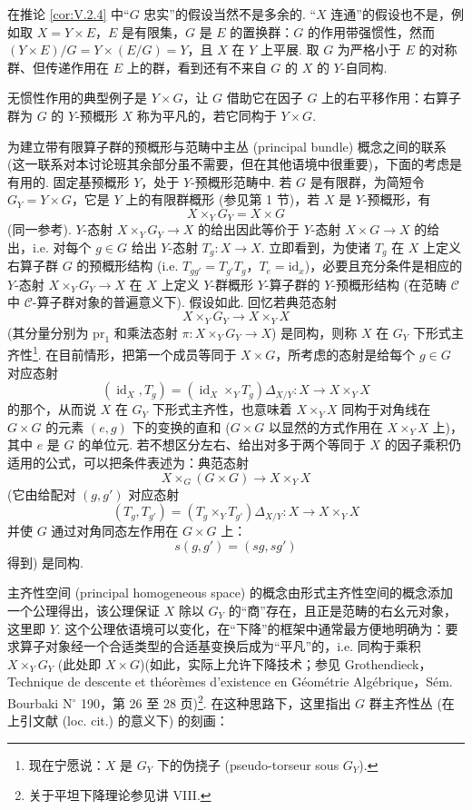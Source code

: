 \begin{remark}\label{rem:V.2.5}
在推论 \ref{cor:V.2.4} 中``$G$ 忠实''的假设当然不是多余的. ``$X$ 连通''的假设也不是，例如取 $X = Y \times E$，$E$ 是有限集，$G$ 是 $E$ 的置换群：$G$ 的作用带强惯性，然而 $(Y \times E)/G = Y \times (E/G) = Y$，且 $X$ 在 $Y$ 上平展. 取 $G$ 为严格小于 $E$ 的对称群、但传递作用在 $E$ 上的群，看到还有不来自 $G$ 的 $X$ 的 $Y$-自同构.
\end{remark}

无惯性作用的典型例子是 $Y \times G$，让 $G$ 借助它在因子 $G$ 上的右平移作用：右算子群为 $G$ 的 $Y$-预概形 $X$ 称为平凡的，若它同构于 $Y \times G$.

为建立带有限算子群的预概形与范畴中主丛 (principal bundle) 概念之间的联系 (这一联系对本讨论班其余部分虽不需要，但在其他语境中很重要)，下面的考虑是有用的. 固定基预概形 $Y$，处于 $Y$-预概形范畴中. 若 $G$ 是有限群，为简短令 $G_Y = Y \times G$，它是 $Y$ 上的有限群概形 (参见第 1 节)，若 $X$ 是 $Y$-预概形，有
\[
X \times_Y G_Y = X \times G
\]
(同一参考). $Y$-态射 $X \times_Y G_Y \to X$ 的给出因此等价于 $Y$-态射 $X \times G \to X$ 的给出，i.e. 对每个 $g \in G$ 给出 $Y$-态射 $T_g \colon X \to X$. 立即看到，为使诸 $T_g$ 在 $X$ 上定义右算子群 $G$ 的预概形结构 (i.e. $T_{gg'} = T_{g'}T_g$，$T_e = \mathrm{id}_x$)，必要且充分条件是相应的 $Y$-态射 $X \times_Y G_Y \to X$ 在 $X$ 上定义 $Y$-群概形 $Y$-算子群的 $Y$-预概形结构 (在范畴 $\mathcal{C}$ 中 $\mathcal{C}$-算子群对象的普遍意义下). 假设如此. 回忆若典范态射
\[
X \times_Y G_Y \longrightarrow X \times_Y X
\]
(其分量分别为 $\mathrm{pr}_1$ 和乘法态射 $\pi \colon X \times_Y G_Y \to X$) 是同构，则称 $X$ 在 $G_Y$ 下形式主齐性\footnote{现在宁愿说：$X$ 是 $G_Y$ 下的伪挠子 (pseudo-torseur sous $G_Y$).}. 在目前情形，把第一个成员等同于 $X \times G$，所考虑的态射是给每个 $g \in G$ 对应态射
\[
(\operatorname{id}_X, T_g) = (\operatorname{id}_X \times_Y T_g)\Delta_{X/Y} \colon X \longrightarrow X \times_Y X
\]
的那个，从而说 $X$ 在 $G_Y$ 下形式主齐性，也意味着 $X \times_Y X$ 同构于对角线在 $G \times G$ 的元素 $(e, g)$ 下的变换的直和 ($G \times G$ 以显然的方式作用在 $X \times_Y X$ 上)，其中 $e$ 是 $G$ 的单位元. 若不想区分左右、给出对多于两个等同于 $X$ 的因子乘积仍适用的公式，可以把条件表述为：典范态射
\[
X \times_G (G \times G) \longrightarrow X \times_Y X
\]
(它由给配对 $(g, g')$ 对应态射
\[
(T_g, T_{g'}) = (T_g \times_Y T_{g'})\Delta_{X/Y} \colon X \longrightarrow X \times_Y X
\]
并使 $G$ 通过对角同态左作用在 $G \times G$ 上：
\[
s(g, g') = (sg, sg')
\]
得到) 是同构.

主齐性空间 (principal homogeneous space) 的概念由形式主齐性空间的概念添加一个公理得出，该公理保证 $X$ 除以 $G_Y$ 的``商''存在，且正是范畴的右幺元对象，这里即 $Y$. 这个公理依语境可以变化，在``下降''的框架中通常最方便地明确为：要求算子对象经一个合适类型的合适基变换后成为``平凡''的，i.e. 同构于乘积 $X \times_Y G_Y$ (此处即 $X \times G$)(如此，实际上允许下降技术；参见 Grothendieck，Technique de descente et théorèmes d'existence en Géométrie Algébrique，Sém. Bourbaki N$^{\circ}$ 190，第 26 至 28 页)\footnote{关于平坦下降理论参见讲 VIII.}. 在这种思路下，这里指出 $G$ 群主齐性丛 (在上引文献 (loc. cit.) 的意义下) 的刻画：

